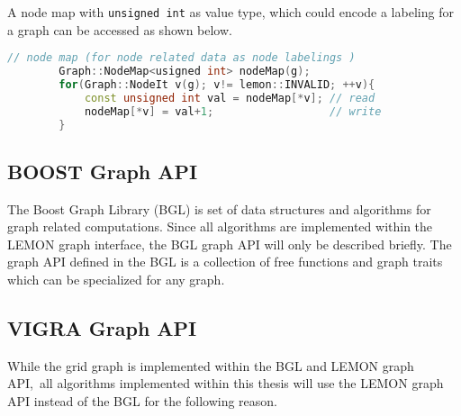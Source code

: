         A node map with  \lstinline{unsigned int} as value type,
        which could encode a labeling for a graph 
        can be accessed as shown below.

        \begin{lstlisting}[language=c++]
        // node map (for node related data as node labelings )
        Graph::NodeMap<usigned int> nodeMap(g);
        for(Graph::NodeIt v(g); v!= lemon::INVALID; ++v){
            const unsigned int val = nodeMap[*v]; // read
            nodeMap[*v] = val+1;                  // write
        }
        \end{lstlisting}




\subsection{BOOST Graph API}\label{sec:boost_graph_apis}
The Boost Graph Library (BGL)  \cite{software_bgl} is set of data structures and 
algorithms for graph related computations.
Since all algorithms are implemented within the LEMON graph interface, 
the BGL graph API will only be described briefly.
The graph API defined in the BGL is a collection of
free functions and graph traits which can be specialized for
any graph.




\subsection{VIGRA Graph API}

While the grid graph is implemented within the BGL and LEMON graph API,\
all algorithms implemented within this thesis will
use the LEMON graph API instead of the BGL 
for the following reason.


